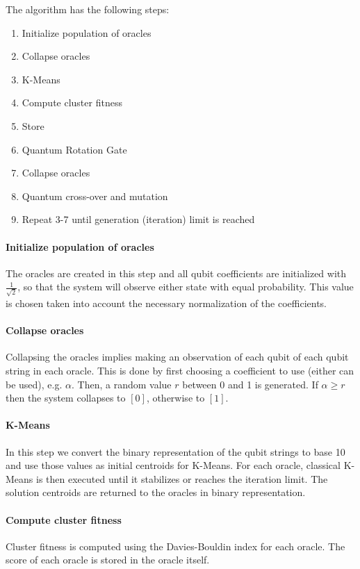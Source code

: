 The algorithm has the following steps:
\begin{enumerate}
\item Initialize population of oracles
\item Collapse oracles
\item K-Means
\item Compute cluster fitness
\item Store
\item Quantum Rotation Gate
\item Collapse oracles
\item Quantum cross-over and mutation
\item Repeat 3-7 until generation (iteration) limit is reached
\end{enumerate}


\paragraph{Initialize population of oracles}

The oracles are created in this step and all qubit coefficients are initialized with $\frac{1}{\sqrt{2}}$, so that the system will observe either state with equal probability. This value is chosen taken into account the necessary normalization of the coefficients.

\paragraph{Collapse oracles}

Collapsing the oracles implies making an observation of each qubit of each qubit string in each oracle. This is done by first choosing a coefficient to use (either can be used), e.g. $\alpha$. Then, a random value $r$ between 0 and 1 is generated. If $\alpha \ge r$ then the system collapses to $[0]$, otherwise to $[1]$.

\paragraph{K-Means}
In this step we convert the binary representation of the qubit strings to base 10 and use those values as initial centroids for K-Means. For each oracle, classical K-Means is then executed until it stabilizes or reaches the iteration limit. The solution centroids are returned to the oracles in binary representation.

\paragraph{Compute cluster fitness}
Cluster fitness is computed using the Davies-Bouldin index for each oracle. The score of each oracle is stored in the oracle itself.

